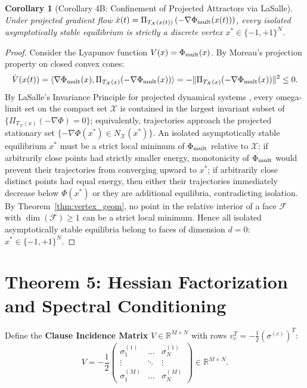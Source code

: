 \documentclass[11pt,a4paper]{article}
\newtheorem{corollary}[theorem]{Corollary}
\begin{document}
\begin{corollary}[Corollary 4B: Confinement of Projected Attractors via LaSalle]
\label{cor:vertex_dyn}
Under projected gradient flow $\dot{x}(t) = \Pi_{T_{\mathcal{X}}(x(t))}\left(-\nabla \Phi_{\rm mult}(x(t))\right)$, every isolated asymptotically stable equilibrium is strictly a discrete vertex $x^* \in \{-1, +1\}^N$.
\end{corollary}

\begin{proof}
Consider the Lyapunov function $V(x) = \Phi_{\rm mult}(x)$. By Moreau's projection property on closed convex cones:
\begin{equation}
\dot{V}(x(t)) = \langle \nabla \Phi_{\rm mult}(x), \Pi_{T_{\mathcal{X}}(x)}(-\nabla \Phi_{\rm mult}(x)) \rangle = -\|\Pi_{T_{\mathcal{X}}(x)}(-\nabla \Phi_{\rm mult}(x))\|^2 \le 0.
\end{equation}
By LaSalle's Invariance Principle for projected dynamical systems \cite{brogliato2006equivalence, nagurney1996projected}, every omega-limit set on the compact set $\mathcal X$ is contained in the largest invariant subset of $\{\Pi_{T_{\mathcal X}(x)}(-\nabla\Phi)=0\}$; equivalently, trajectories approach the projected stationary set $\{-\nabla\Phi(x^*)\in N_{\mathcal X}(x^*)\}$.
An isolated asymptotically stable equilibrium $x^*$ must be a strict local minimum of $\Phi_{\rm mult}$ relative to $\mathcal X$: if arbitrarily close points had strictly smaller energy, monotonicity of $\Phi_{\rm mult}$ would prevent their trajectories from converging upward to $x^*$; if arbitrarily close distinct points had equal energy, then either their trajectories immediately decrease below $\Phi(x^*)$ or they are additional equilibria, contradicting isolation. By Theorem~\ref{thm:vertex_geom}, no point in the relative interior of a face $\mathcal{F}$ with $\dim(\mathcal{F}) \ge 1$ can be a strict local minimum. Hence all isolated asymptotically stable equilibria belong to faces of dimension $d=0$: $x^* \in \{-1, +1\}^N$.
\end{proof}

\section{Theorem 5: Hessian Factorization and Spectral Conditioning}

Define the \textbf{Clause Incidence Matrix} $V \in \mathbb{R}^{M \times N}$ with rows $v_c^T = -\frac{1}{2}(\sigma^{(c)})^T$:
\begin{equation}
V = -\frac{1}{2} \begin{pmatrix} \sigma_1^{(1)} & \dots & \sigma_N^{(1)} \\ \vdots & \ddots & \vdots \\ \sigma_1^{(M)} & \dots & \sigma_N^{(M)} \end{pmatrix} \in \mathbb{R}^{M \times N}.
\end{equation}
\end{document}
